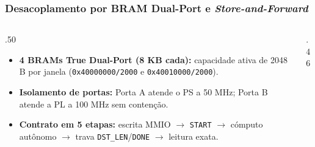 \begin{frame}
  \frametitle{Desacoplamento por BRAM Dual-Port e \textit{Store-and-Forward}}
  \begin{columns}[T]
    \begin{column}{.50\textwidth}
      \begin{itemize}
        \item \textbf{4 BRAMs True Dual-Port (8 KB cada):} capacidade ativa de 2048 B por janela (\texttt{0x40000000/2000} e \texttt{0x40010000/2000}).
        \item \textbf{Isolamento de portas:} Porta A atende o PS a 50 MHz; Porta B atende a PL a 100 MHz sem conten\c{c}\~ao.
        \item \textbf{Contrato em 5 etapas:} escrita MMIO $\rightarrow$ \texttt{START} $\rightarrow$ c\'omputo aut\^onomo $\rightarrow$ trava \texttt{DST\_LEN}/\texttt{DONE} $\rightarrow$ leitura exata.
      \end{itemize}
    \end{column}
    \begin{column}{.46\textwidth}
      \centering
    \end{column}
  \end{columns}
\end{frame}
